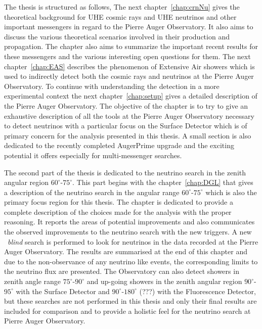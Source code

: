 The thesis is structured as follows, The next chapter~\ref{chap:crnNu} gives the theoretical background for UHE cosmic rays and UHE neutrinos and other important messengers in regard to the Pierre Auger Observatory. It also aims to discuss the various theoretical scenarios involved in their production and propagation. The chapter also aims to summarize the important recent results for these messengers and the various interesting open questions for them. The next chapter~\ref{chap:EAS} describes the phenomenon of Extensive Air showers which is used to indirectly detect both the cosmic rays and neutrinos at the Pierre Auger Observatory. To continue with understanding the detection in a more experimental context the next chapter~\ref{chap:setup} gives a detailed description of the Pierre Auger Observatory. The objective of the chapter is to try to give an exhaustive description of all the tools at the Pierre Auger Observatory necessary to detect neutrinos with a particular focus on the Surface Detector which is of primary concern for the analysis presented in this thesis. A small section is also dedicated to the recently completed AugerPrime upgrade and the exciting potential it offers especially for multi-messenger searches. 

The second part of the thesis is dedicated to the neutrino search in the zenith angular region $60^\circ$-$75^\circ$. This part begins with the chapter~\ref{chap:DGL} that gives a description of the neutrino search in the angular range $60^\circ$-$75^\circ$ which is also the primary focus region for this thesis. The chapter is dedicated to provide a complete description of the choices made for the analysis with the proper reasoning. It reports the areas of potential improvements and also communicates the observed improvements to the neutrino search with the new triggers. A new ~\textit{blind} search is performed to look for neutrinos in the data recorded at the Pierre Auger Observatory. The results are summarised at the end of this chapter and due to the non-observance of any neutrino like events, the corresponding limits to the neutrino flux are presented. The Observatory can also detect showers in zenith angle range $75^\circ$-$90^\circ$ and up-going showers in the zenith angular region $90^\circ$-$95^\circ$ with the Surface Detector and $90^\circ$-$180^\circ$ (???) with the Fluorescence Detector, but these searches are not performed in this thesis and only their final results are included for comparison and to provide a holistic feel for the neutrino search at Pierre Auger Observatory.

